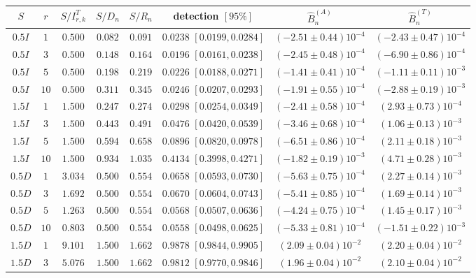 \begin{table}[t]
\centering
\small
\begin{tabular}{cccccccc}
\toprule
$S$ & $r$ & $S/I^{T}_{r,k}$ & $S/D_n$ & $S/R_n$ & detection $[95\%]$ & $\widehat B_n^{(A)}$ & $\widehat B_n^{(T)}$\\
\midrule
$0.5I$ & $1$ & $0.500$ & $0.082$ & $0.091$ & $0.0238$ $[0.0199,0.0284]$ & $(-2.51\pm0.44)10^{-4}$ & $(-2.43\pm0.47)10^{-4}$\\
$0.5I$ & $3$ & $0.500$ & $0.148$ & $0.164$ & $0.0196$ $[0.0161,0.0238]$ & $(-2.45\pm0.48)10^{-4}$ & $(-6.90\pm0.86)10^{-4}$\\
$0.5I$ & $5$ & $0.500$ & $0.198$ & $0.219$ & $0.0226$ $[0.0188,0.0271]$ & $(-1.41\pm0.41)10^{-4}$ & $(-1.11\pm0.11)10^{-3}$\\
$0.5I$ & $10$ & $0.500$ & $0.311$ & $0.345$ & $0.0246$ $[0.0207,0.0293]$ & $(-1.91\pm0.55)10^{-4}$ & $(-2.88\pm0.19)10^{-3}$\\
$1.5I$ & $1$ & $1.500$ & $0.247$ & $0.274$ & $0.0298$ $[0.0254,0.0349]$ & $(-2.41\pm0.58)10^{-4}$ & $(2.93\pm0.73)10^{-4}$\\
$1.5I$ & $3$ & $1.500$ & $0.443$ & $0.491$ & $0.0476$ $[0.0420,0.0539]$ & $(-3.46\pm0.68)10^{-4}$ & $(1.06\pm0.13)10^{-3}$\\
$1.5I$ & $5$ & $1.500$ & $0.594$ & $0.658$ & $0.0896$ $[0.0820,0.0978]$ & $(-6.51\pm0.86)10^{-4}$ & $(2.11\pm0.18)10^{-3}$\\
$1.5I$ & $10$ & $1.500$ & $0.934$ & $1.035$ & $0.4134$ $[0.3998,0.4271]$ & $(-1.82\pm0.19)10^{-3}$ & $(4.71\pm0.28)10^{-3}$\\
$0.5D$ & $1$ & $3.034$ & $0.500$ & $0.554$ & $0.0658$ $[0.0593,0.0730]$ & $(-5.63\pm0.75)10^{-4}$ & $(2.27\pm0.14)10^{-3}$\\
$0.5D$ & $3$ & $1.692$ & $0.500$ & $0.554$ & $0.0670$ $[0.0604,0.0743]$ & $(-5.41\pm0.85)10^{-4}$ & $(1.69\pm0.14)10^{-3}$\\
$0.5D$ & $5$ & $1.263$ & $0.500$ & $0.554$ & $0.0568$ $[0.0507,0.0636]$ & $(-4.24\pm0.75)10^{-4}$ & $(1.45\pm0.17)10^{-3}$\\
$0.5D$ & $10$ & $0.803$ & $0.500$ & $0.554$ & $0.0558$ $[0.0498,0.0625]$ & $(-5.33\pm0.81)10^{-4}$ & $(-1.51\pm0.22)10^{-3}$\\
$1.5D$ & $1$ & $9.101$ & $1.500$ & $1.662$ & $0.9878$ $[0.9844,0.9905]$ & $(2.09\pm0.04)10^{-2}$ & $(2.20\pm0.04)10^{-2}$\\
$1.5D$ & $3$ & $5.076$ & $1.500$ & $1.662$ & $0.9812$ $[0.9770,0.9846]$ & $(1.96\pm0.04)10^{-2}$ & $(2.10\pm0.04)10^{-2}$\\

\end{tabular}
\end{table}
